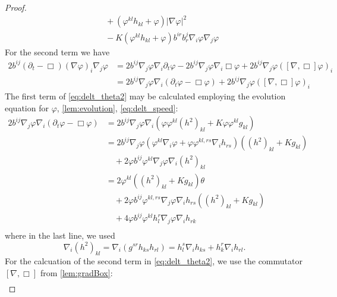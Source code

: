 \documentclass{amsart}
\begin{document}
\begin{proof}
\begin{equation}
\begin{split}
&\quad + (\varphi^{kl}h_{kl} + \varphi)|\nabla\varphi|^{2} \\
&\quad - K(\varphi^{kl}h_{kl} + \varphi)b^{ir}b^{j}_{r}\nabla_i \varphi\nabla_j\varphi 
\end{split}
\end{equation}
For the second term we have
\begin{equation}
\label{eq:delt_theta2}
\begin{split}
2 b^{ij} (\partial_{t} - \Box) (\nabla\varphi)_i \nabla_j\varphi &= 2 b^{ij} \nabla_j \varphi \nabla_i \partial_{t} \varphi - 2 b^{ij} \nabla_j\varphi \nabla_i \Box \varphi + 2 b^{ij} \nabla_j \varphi ([\nabla, \Box] \varphi)_i \\
&= 2 b^{ij} \nabla_j \varphi \nabla_i (\partial_{t} \varphi - \Box \varphi) + 2 b^{ij} \nabla_j \varphi ([\nabla, \Box] \varphi)_i
\end{split}
\end{equation}
The first term of \cref{eq:delt_theta2} may be calculated employing the evolution equation for \(\varphi\), \cref{lem:evolution}, \cref{eq:delt_speed}:
\begin{equation}
\label{eq:delt_theta2a}
\begin{split}
2 b^{ij} \nabla_j \varphi \nabla_i (\partial_{t} \varphi - \Box\varphi) &= 2 b^{ij} \nabla_j \varphi \nabla_i (\varphi\varphi^{kl}(h^2)_{kl} + K \varphi\varphi^{kl}g_{kl}) \\
&= 2 b^{ij} \nabla_j \varphi (\varphi^{kl}\nabla_i \varphi + \varphi\varphi^{kl,rs} \nabla_i h_{rs})((h^2)_{kl} + K g_{kl}) \\
&\quad + 2 \varphi b^{ij} \varphi^{kl} \nabla_j \varphi \nabla_i (h^2)_{kl} \\
&= 2 \varphi^{kl}((h^2)_{kl} + K g_{kl}) \theta \\
&\quad + 2 \varphi b^{ij} \varphi^{kl,rs} \nabla_j \varphi \nabla_i h_{rs} ((h^2)_{kl} + K g_{kl}) \\
&\quad + 4 \varphi b^{ij} \varphi^{kl} h^r_l \nabla_j \varphi \nabla_i h_{rk} \\
\end{split}
\end{equation}
where in the last line, we used
\[
\nabla_i (h^2)_{kl} = \nabla_i (g^{sr} h_{ks} h_{rl}) = h^s_l \nabla_i h_{ks} + h^r_k \nabla_i h_{rl}.
\]
For the calcuation of the second term in \cref{eq:delt_theta2}, we use the commutator \([\nabla, \Box]\) from \cref{lem:gradBox}:
\begin{equation}
\label{eq:delt_theta2b}
\begin{split}

\end{split}
\end{equation}
\end{proof}
\end{document}
